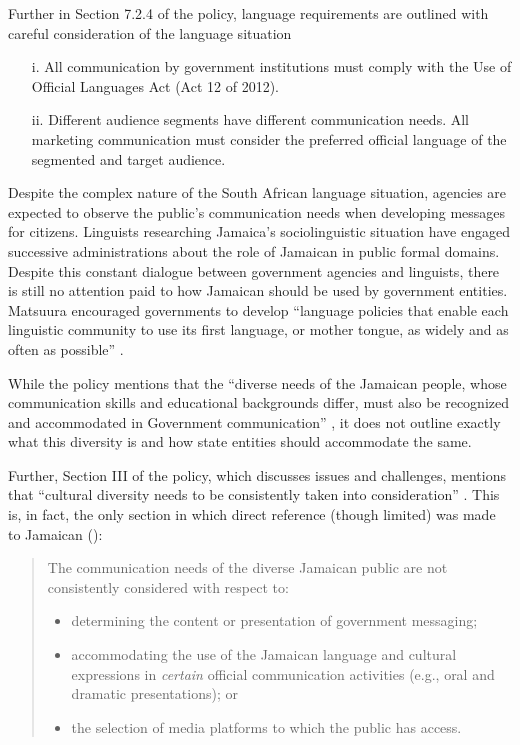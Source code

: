 \documentclass[output=paper,colorlinks,citecolor=brown]{langscibook}
\begin{document}
Further in Section 7.2.4 of the policy, language requirements are outlined with careful consideration of the language situation

\begin{enumerate}
    \item[i.] All communication by government institutions must comply with the Use of Official Languages Act (Act 12 of 2012).
    
    \item[ii.] Different audience segments have different communication needs. All marketing communication must consider the preferred official language of the segmented and target audience. \citep[45]{GovernmentCommunicationPolic2018}
\end{enumerate}

Despite the complex nature of the South African language situation, agencies are expected to observe the public’s communication needs when developing messages for citizens. Linguists researching Jamaica’s sociolinguistic situation have engaged successive administrations about the role of Jamaican in public formal domains. Despite this constant dialogue between government agencies and linguists, there is still no attention paid to how Jamaican should be used by government entities. Matsuura encouraged governments to develop “language policies that enable each linguistic community to use its first language, or mother tongue, as widely and as often as possible” \citep[par. 8]{Matsuura2007}.

While the policy mentions that the “diverse needs of the Jamaican people, whose communication skills and educational backgrounds differ, must also be recognized and accommodated in Government communication” \citep[11]{GovernmentJamaicaCommunicationPolicy2015}, it does not outline exactly what this diversity is and how state entities should accommodate the same. 

Further, Section III of the policy, which discusses issues and challenges, mentions that “cultural diversity needs to be consistently taken into consideration” \citep[13]{GovernmentJamaicaCommunicationPolicy2015}. This is, in fact, the only section in which direct reference (though limited) was made to Jamaican (\citeyear[33]{GovernmentJamaicaCommunicationPolicy2015}):


\begin{quote}
The communication needs of the diverse Jamaican public are not consistently considered with respect to: 
\begin{itemize}
    \item determining the content or presentation of government messaging;
    \item accommodating the use of the Jamaican language and cultural expressions in \emph{certain} official communication activities (e.g., oral and dramatic presentations); or 
    \item the selection of media platforms to which the public has access.
\end{itemize}
\end{quote}
\end{document}

